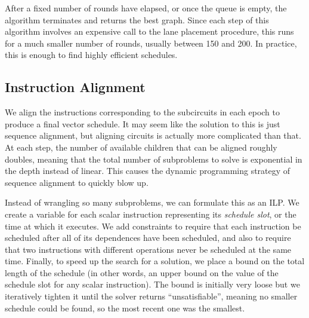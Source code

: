 After a fixed number of rounds have elapsed, or once the queue is empty, the algorithm terminates and returns the best graph.
Since each step of this algorithm involves an expensive call to the lane placement procedure, this runs for a much smaller number of rounds, usually between 150 and 200.
In practice, this is enough to find highly efficient schedules.

\subsection{Instruction Alignment}\label{sec:instruction-alignment}
We align the instructions corresponding to the subcircuits in each epoch to produce a final vector schedule.
It may seem like the solution to this is just sequence alignment, but aligning circuits is actually more complicated than that.
At each step, the number of available children that can be aligned roughly doubles, meaning that the total number of subproblems to solve is exponential in the depth instead of linear. 
This causes the dynamic programming strategy of sequence alignment to quickly blow up.

Instead of wrangling so many subproblems, we can formulate this as an ILP.
We create a variable for each scalar instruction representing its {\em schedule slot}, or the time at which it executes.
We add constraints to require that each instruction be scheduled after all of its dependences have been scheduled, and also to require that two instructions with different operations never be scheduled at the same time. 
Finally, to speed up the search for a solution, we place a bound on the total length of the schedule (in other words, an upper bound on the value of the schedule slot for any scalar instruction).
The bound is initially very loose but we iteratively tighten it until the solver returns ``unsatisfiable'', meaning no smaller schedule could be found, so the most recent one was the smallest.